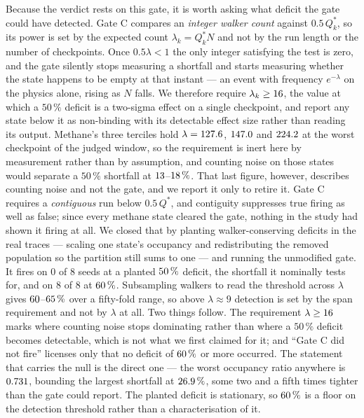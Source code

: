 Because the verdict rests on this gate, it is worth asking what deficit the gate could have
detected. Gate C compares an \emph{integer walker count} against $0.5\,Q^*_k$, so its power is
set by the expected count $\lambda_k = Q^*_k N$ and not by the run length or the number of
checkpoints. Once $0.5\lambda < 1$ the only integer satisfying the test is zero, and the gate
silently stops measuring a shortfall and starts measuring whether the state happens to be empty
at that instant --- an event with frequency $e^{-\lambda}$ on the physics alone, rising as $N$
falls. We therefore require $\lambda_k \geq 16$, the value at which a $50\,\%$
deficit is a two-sigma effect on a single checkpoint, and report any state below it as
non-binding with its detectable effect size rather than reading its output. Methane's three
terciles hold $\lambda = 127.6$, $147.0$ and $224.2$ at the worst
checkpoint of the judged window, so the requirement is inert here by measurement rather than by
assumption, and counting noise on those states would separate a $50\,\%$ shortfall at
$13$--$18\,\%$. That last figure, however, describes counting noise and not
the gate, and we report it only to retire it. Gate C requires a
\emph{contiguous} run below $0.5\,Q^*$, and contiguity suppresses true firing as well as false;
since every methane state cleared the gate, nothing in the study had shown it firing at all. We
closed that by planting walker-conserving deficits in the real traces --- scaling one state's
occupancy and redistributing the removed population so the partition still sums to one --- and
running the unmodified gate. It fires on $0$ of $8$ seeds at a planted $50\,\%$
deficit, the shortfall it nominally tests for, and on $8$ of $8$ at $60\,\%$.
Subsampling walkers to read the threshold across $\lambda$ gives
$60$--$65\,\%$ over a fifty-fold range, so above $\lambda \approx 9$
detection is set by the span requirement and not by $\lambda$ at all. Two things follow. The
requirement $\lambda \geq 16$ marks where counting noise stops dominating rather
than where a $50\,\%$ deficit becomes detectable, which is not what we first claimed for it; and
``Gate C did not fire'' licenses only that no deficit of $60\,\%$ or more occurred.
The statement that carries the null is the direct one --- the worst occupancy ratio anywhere is
$0.731$, bounding the largest shortfall at $26.9\,\%$, some two and a
fifth times tighter than the gate could report. The planted deficit is stationary, so
$60\,\%$ is a floor on the detection threshold rather than a characterisation of it.

